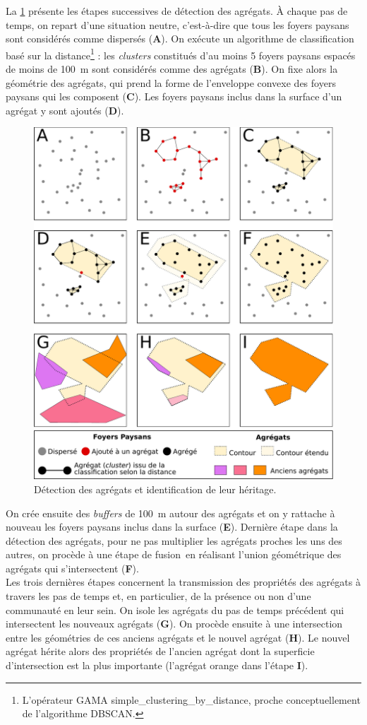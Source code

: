 La \cref{fig:detection-agregats} présente les étapes successives de détection des agrégats.
À chaque pas de temps, on repart d'une situation \og neutre\fg{}, c'est-à-dire que tous les foyers paysans sont considérés comme dispersés (\textbf{A}).
On exécute un algorithme de classification basé sur la distance\footnote{
	L'opérateur GAMA \textsf{simple\_clustering\_by\_distance}, proche conceptuellement de l'algorithme DBSCAN.
} : les \textit{clusters} constitués d'au moins 5 foyers paysans espacés de moins de 100~m sont considérés comme des agrégats (\textbf{B}).
On fixe alors la géométrie des agrégats, qui prend la forme de l'enveloppe convexe des foyers paysans qui les composent (\textbf{C}).
Les foyers paysans inclus dans la surface d'un agrégat y sont ajoutés (\textbf{D}).
	
\begin{figure}[H]
	\centering
	\includegraphics[width=.75\linewidth]{img/detection_agregats.pdf}
	\caption{Détection des agrégats et identification de leur \og héritage\fg{}.}
	\label{fig:detection-agregats}
\end{figure}

On crée ensuite des \textit{buffers} de 100~m autour des agrégats et on y rattache à nouveau les foyers paysans inclus dans la surface (\textbf{E}).
Dernière étape dans la détection des agrégats, pour ne pas multiplier les agrégats proches les uns des autres, on procède à une étape de fusion en réalisant l'union géométrique des agrégats qui s'intersectent (\textbf{F}).\\
Les trois dernières étapes concernent la transmission des propriétés des agrégats à travers les pas de temps et, en particulier, de la présence ou non d'une communauté en leur sein.
On isole les agrégats du pas de temps précédent qui intersectent les nouveaux agrégats (\textbf{G}).
On procède ensuite à une intersection entre les géométries de ces anciens agrégats et le nouvel agrégat (\textbf{H}).
Le nouvel agrégat hérite alors des propriétés de l'ancien agrégat dont la superficie d'intersection est la plus importante (l'agrégat orange dans l'étape \textbf{I}).
	
